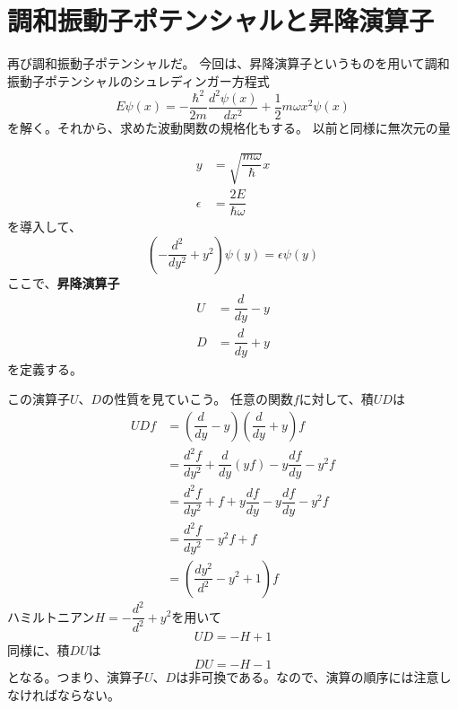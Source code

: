 
\section{調和振動子ポテンシャルと昇降演算子}
再び調和振動子ポテンシャルだ。
今回は、昇降演算子というものを用いて調和振動子ポテンシャルのシュレディンガー方程式
\begin{equation}
  \label{harmony_schrodinger_eq}
  E\psi(x) = - \dfrac{\hbar^2}{2m} \dfrac{d^2 \psi(x)}{d x^2} + \dfrac{1}{2}m\omega x^2\psi(x)
\end{equation}
を解く。それから、求めた波動関数の規格化もする。
以前と同様に無次元の量

\begin{align}
  \label{y}
  y &= \sqrt{\dfrac{m\omega}{\hbar}}x \\
  \label{eps}
  \epsilon &= \dfrac{2E}{\hbar\omega}
\end{align}
を導入して、
\begin{equation}
  \label{harmony_DE}
  \left( -\dfrac{d^2}{d y^2} + y^2 \right) \psi(y) = \epsilon\psi(y)
\end{equation}
ここで、{\bf 昇降演算子}
\begin{align}
  \label{U}
  U &= \dfrac{d}{dy} - y \\
  \label{D}
  D &= \dfrac{d}{dy} + y
\end{align}
を定義する。

この演算子$U、D$の性質を見ていこう。
任意の関数$f$に対して、積$UD$は
\begin{align}
  UDf &= \left( \dfrac{d}{dy} - y \right)\left( \dfrac{d}{dy} + y \right)f \\
  &= \dfrac{d^2f}{dy^2} + \dfrac{d}{dy}(yf) - y\dfrac{df}{dy} - y^2 f \\
  &= \dfrac{d^2f}{dy^2} + f +  y\dfrac{df}{dy} - y\dfrac{df}{dy} - y^2 f \\
  &= \dfrac{d^2f}{dy^2} -y^2 f + f \\
  &= \left( \dfrac{dy^2}{d^2} -y^2 + 1\right)f
\end{align}
ハミルトニアン$H = -\dfrac{d^2}{d^2} + y^2$を用いて
\begin{equation}
  \label{UD}
  UD = -H + 1
\end{equation}
同様に、積$DU$は
\begin{equation}
  \label{DU}
  DU = -H - 1
\end{equation}
となる。つまり、演算子$U、D$は非可換である。なので、演算の順序には注意しなければならない。


